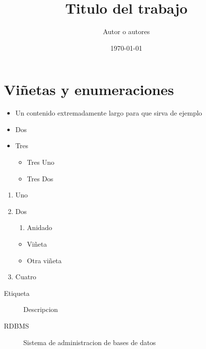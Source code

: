 \documentclass[
    a4paper,
    12pt
]{article}
\title{Titulo del trabajo}
\date{\today}
\author{Autor o autores}
\begin{document}
	\maketitle
	\begin{abstract}
		\lipsum[1-2]
	\end{abstract}

    \section{Viñetas y enumeraciones}

	\begin{itemize}
		\item Un contenido extremadamente largo para que sirva de ejemplo
		\item Dos
		\item Tres
		\begin{itemize}
			\item Tres Uno
			\item Tres Dos
		\end{itemize}
	\end{itemize}
%
	\begin{enumerate}
		\item Uno
		\item Dos
		\begin{enumerate}
			\item Anidado
		\end{enumerate}
		\begin{itemize}
			\item Viñeta
			\item Otra viñeta
		\end{itemize}
		\item Cuatro
	\end{enumerate}

	\begin{description}
		\item[Etiqueta] Descripcion
		\item[RDBMS] Sistema de administracion de bases de datos
	\end{description}

    \begin{center}
        \lipsum[1]
    \end{center}

    \begin{quote}
        \lipsum[1]
    \end{quote}

    \begin{quotation}
        \lipsum[1]
    \end{quotation}

	
\end{document}

